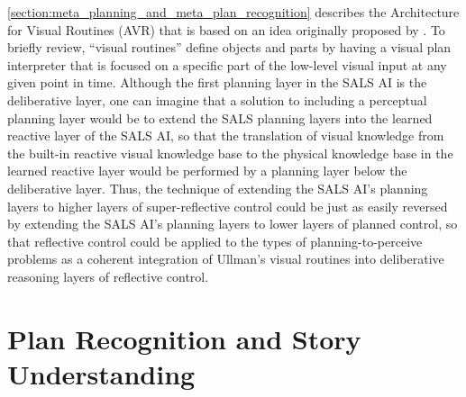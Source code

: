 {\mbox{\autoref{section:meta_planning_and_meta_plan_recognition}}}
describes the Architecture for Visual Routines (AVR) \cite[]{rao:1998}
that is based on an idea originally proposed by \cite{ullman:1984}.
To briefly review, ``visual routines'' define objects and parts by
having a visual plan interpreter that is focused on a specific part of
the low-level visual input at any given point in time.  Although the
first planning layer in the SALS AI is the deliberative layer, one can
imagine that a solution to including a perceptual planning layer would
be to extend the SALS planning layers into the learned reactive layer
of the SALS AI, so that the translation of visual knowledge from the
built-in reactive visual knowledge base to the physical knowledge base
in the learned reactive layer would be performed by a planning layer
below the deliberative layer.  Thus, the technique of extending the
SALS AI's planning layers to higher layers of super-reflective control
could be just as easily reversed by extending the SALS AI's planning
layers to lower layers of planned control, so that reflective control
could be applied to the types of planning-to-perceive problems as a
coherent integration of Ullman's visual routines into deliberative
reasoning layers of reflective control.

\section{Plan Recognition and Story Understanding}

